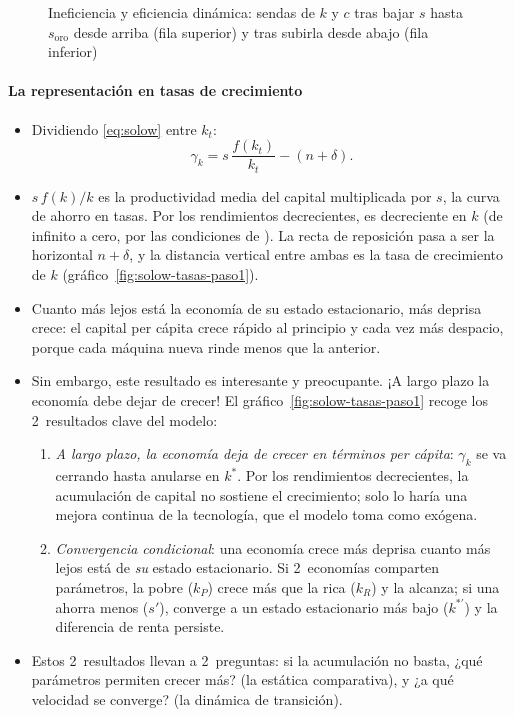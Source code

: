 \documentclass[11pt]{article}
\begin{document}
\begin{figure}[H]
\centering
\caption{Ineficiencia y eficiencia dinámica: sendas de $k$ y $c$ tras bajar $s$ hasta $s_{\mathrm{oro}}$ desde arriba (fila superior) y tras subirla desde abajo (fila inferior)}\label{fig:ineficiencia-dinamica}
\end{figure}

\paragraph{La representación en tasas de crecimiento}

\begin{itemize}
\item Dividiendo \eqref{eq:solow} entre $k_t$:
  \begin{equation}
  \gamma_k=s\,\frac{f(k_t)}{k_t}-(n+\delta).\label{eq:tasas-solow}
  \end{equation}
\item $s\,f(k)/k$ es la productividad media del capital multiplicada por $s$, la curva de ahorro en tasas. Por los rendimientos decrecientes, es decreciente en $k$ (de infinito a cero, por las condiciones de ). La recta de reposición pasa a ser la horizontal $n+\delta$, y la distancia vertical entre ambas es la tasa de crecimiento de $k$ (gráfico~\ref{fig:solow-tasas-paso1}).
\item Cuanto más lejos está la economía de su estado estacionario, más deprisa crece: el capital per cápita crece rápido al principio y cada vez más despacio, porque cada máquina nueva rinde menos que la anterior.
\item Sin embargo, este resultado es interesante y preocupante. ¡A largo plazo la economía debe dejar de crecer! El gráfico~\ref{fig:solow-tasas-paso1} recoge los 2~resultados clave del modelo:
  \begin{enumerate}
  \item \emph{A largo plazo, la economía deja de crecer en términos per cápita}: $\gamma_k$ se va cerrando hasta anularse en $k^*$. Por los rendimientos decrecientes, la acumulación de capital no sostiene el crecimiento; solo lo haría una mejora continua de la tecnología, que el modelo toma como exógena.
  \item \emph{Convergencia condicional}: una economía crece más deprisa cuanto más lejos está de \emph{su} estado estacionario. Si 2~economías comparten parámetros, la pobre ($k_P$) crece más que la rica ($k_R$) y la alcanza; si una ahorra menos ($s'$), converge a un estado estacionario más bajo ($k^{*\prime}$) y la diferencia de renta persiste.
  \end{enumerate}
\item Estos 2~resultados llevan a 2~preguntas: si la acumulación no basta, ¿qué parámetros permiten crecer más? (la estática comparativa), y ¿a qué velocidad se converge? (la dinámica de transición).
\end{itemize}
\end{document}
